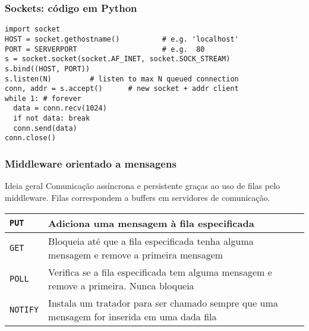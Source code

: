 \documentclass[Ligatures=TeX,table,brazil,svgnames,usetotalslideindicator,compress,10pt]{beamer}
\begin{document}
\begin{frame}[fragile]
  \frametitle{Sockets: código em Python}
\begin{verbatim}
import socket
HOST = socket.gethostname()          # e.g. 'localhost'
PORT = SERVERPORT                    # e.g.  80
s = socket.socket(socket.AF_INET, socket.SOCK_STREAM)
s.bind((HOST, PORT))
s.listen(N)         # listen to max N queued connection
conn, addr = s.accept()      # new socket + addr client
while 1: # forever
  data = conn.recv(1024)
  if not data: break
  conn.send(data)
conn.close()
\end{verbatim}
\end{frame}

\begin{frame}
  \frametitle{Middleware orientado a mensagens}
  \begin{block}{Ideia geral}
    Comunicação assíncrona e persistente graças ao uso de \alert{filas} pelo middleware. Filas correspondem a buffers em servidores de comunicação.
  \end{block}

  \begin{center}
    \small
    \renewcommand{\arraystretch}{1.1}
    \begin{tabular}{|>{\texttt}l|p{8cm}|}\hline
      \texttt{PUT}    & Adiciona uma mensagem à fila especificada \\ \hline
      \texttt{GET}    & Bloqueia até que a fila especificada tenha alguma mensagem e remove a primeira mensagem \\ \hline
      \texttt{POLL}   & Verifica se a fila especificada tem alguma mensagem e remove a primeira. Nunca bloqueia \\ \hline
      \texttt{NOTIFY} & Instala um tratador para ser chamado sempre que uma mensagem for inserida em uma dada fila \\ \hline
    \end{tabular}
  \end{center}

\end{frame}
\end{document}
